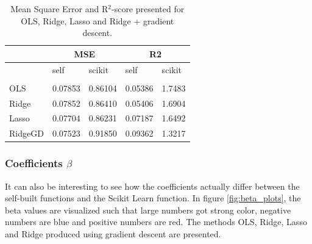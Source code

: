 \begin{table} [H]
	\caption{Mean Square Error and R$^2$-score presented for OLS, Ridge, Lasso and Ridge + gradient descent.  \vspace{2mm}}
	\begin{tabularx}{\textwidth}{l|XX|XX} \hline\hline
		\label{tab:franke_error}
		& \multicolumn{2}{c}{\textbf{MSE}}&\multicolumn{2}{c}{\textbf{R2}}\\ \hline
		&self&scikit&self&scikit\\ \hline \\
		OLS & 0.07853 & 0.86104 & 0.05386 & 1.7483\\
		Ridge & 0.07852 & 0.86410 & 0.05406 & 1.6904 \\
		Lasso & 0.07704 & 0.86231 & 0.07187 & 1.6492 \\
		RidgeGD & 0.07523 & 0.91850 & 0.09362 & 1.3217 \\ \hline
	\end{tabularx}
\end{table}


\subsubsection{Coefficients $\beta$}
It can also be interesting to see how the coefficients actually differ between the self-built functions and the Scikit Learn function. In figure \eqref{fig:beta_plots}, the beta values are visualized such that large numbers got strong color, negative numbers are blue and positive numbers are red. The methods OLS, Ridge, Lasso and Ridge produced using gradient descent are presented. 

